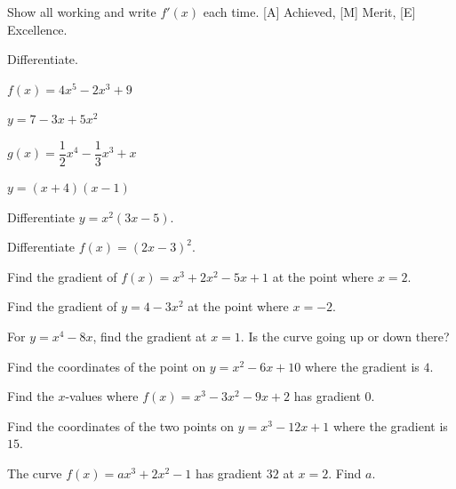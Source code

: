 \documentclass[11pt]{article}
\begin{document}
Show all working and write $f'(x)$ each time. [A] Achieved, [M] Merit, [E] Excellence.

\Q Differentiate.
\begin{parts}
\item $f(x)=4x^{5}-2x^{3}+9$
\item $y=7-3x+5x^{2}$
\item $g(x)=\dfrac{1}{2}x^{4}-\dfrac{1}{3}x^{3}+x$
\item $y=(x+4)(x-1)$
\end{parts}

\Q Differentiate $y=x^{2}(3x-5)$.

\Q Differentiate $f(x)=(2x-3)^{2}$.

\Q Find the gradient of $f(x)=x^{3}+2x^{2}-5x+1$ at the point where $x=2$.

\Q Find the gradient of $y=4-3x^{2}$ at the point where $x=-2$.
\ALine{}

\Q For $y=x^{4}-8x$, find the gradient at $x=1$. Is the curve going up or down there?

\Q Find the coordinates of the point on $y=x^{2}-6x+10$ where the gradient is $4$.

\Q Find the $x$-values where $f(x)=x^{3}-3x^{2}-9x+2$ has gradient $0$.

\Q Find the coordinates of the two points on $y=x^{3}-12x+1$ where the gradient is $15$.

\Q The curve $f(x)=ax^{3}+2x^{2}-1$ has gradient $32$ at $x=2$. Find $a$.
\end{document}
